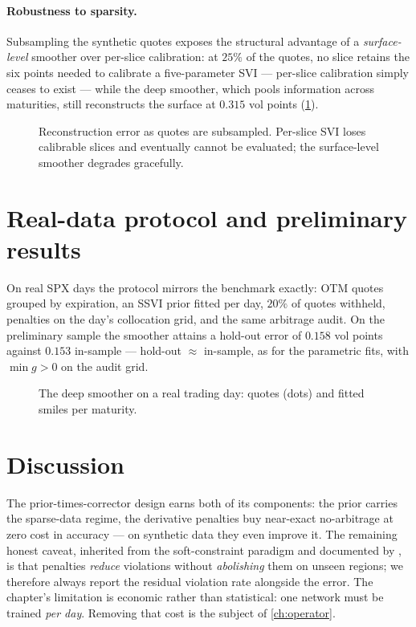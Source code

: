 \paragraph{Robustness to sparsity.} Subsampling the synthetic quotes exposes
the structural advantage of a \emph{surface-level} smoother over per-slice
calibration: at $25\%$ of the quotes, no slice retains the six points needed
to calibrate a five-parameter SVI --- per-slice calibration simply ceases to
exist --- while the deep smoother, which pools information across maturities,
still reconstructs the surface at $0.315$ vol points
(\cref{fig:sparsity}).

\begin{figure}[t]
  \centering
  \caption[Robustness to quote sparsity]{Reconstruction error as quotes are
  subsampled. Per-slice SVI loses calibrable slices and eventually cannot be
  evaluated; the surface-level smoother degrades gracefully.}
  \label{fig:sparsity}
\end{figure}

\section{Real-data protocol and preliminary results}
\label{sec:dsreal}

On real SPX days the protocol mirrors the benchmark exactly: OTM quotes
grouped by expiration, an SSVI prior fitted per day, $20\%$ of quotes
withheld, penalties on the day's collocation grid, and the same
arbitrage audit. On the preliminary sample the smoother attains a hold-out
error of $0.158$ vol points against $0.153$ in-sample --- hold-out
$\approx$ in-sample, as for the parametric fits, with $\min g>0$ on the
audit grid. 

\begin{figure}[t]
  \centering
  \caption[Deep smoother on real SPX quotes]{The deep smoother on a real
  trading day: quotes (dots) and fitted smiles per maturity.}
  \label{fig:dssmiles}
\end{figure}

\section{Discussion}
The prior-times-corrector design earns both of its components: the prior
carries the sparse-data regime, the derivative penalties buy near-exact
no-arbitrage at zero cost in accuracy --- on synthetic data they even improve
it. The remaining honest caveat, inherited from the soft-constraint
paradigm and documented by \cite{chataigner2020deep}, is that penalties
\emph{reduce} violations without \emph{abolishing} them on unseen regions;
we therefore always report the residual violation rate alongside the error.
The chapter's limitation is economic rather than statistical: one network
must be trained \emph{per day}. Removing that cost is the subject of
\cref{ch:operator}.

